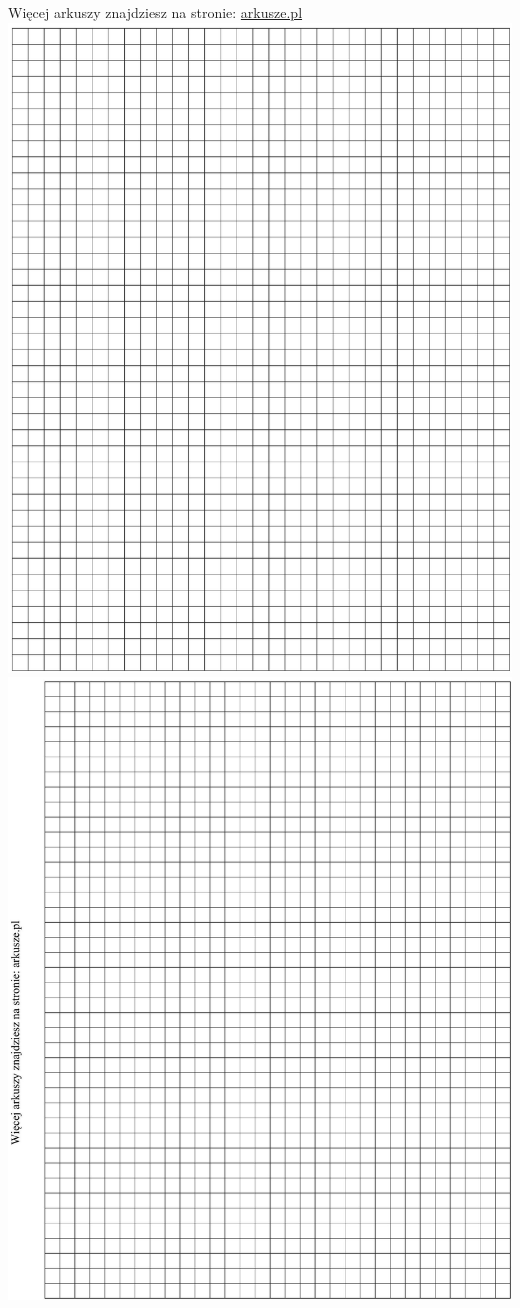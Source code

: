 \documentclass[10pt]{article}
\begin{document}
Więcej arkuszy znajdziesz na stronie: \href{http://arkusze.pl}{arkusze.pl}\\
\includegraphics[max width=\textwidth, center]{2024_11_21_1e89351873aa60c4c1b9g-20}\\
\includegraphics[max width=\textwidth, center]{2024_11_21_1e89351873aa60c4c1b9g-21}
\end{document}

